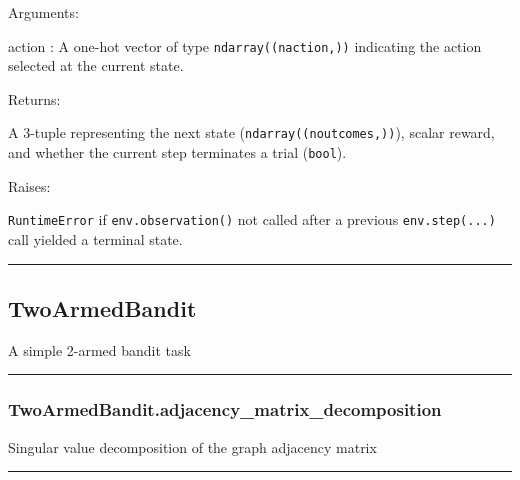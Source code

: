 Arguments:

action : A one-hot vector of type \texttt{ndarray((naction,))}
indicating the action selected at the current state.

Returns:

A 3-tuple representing the next state (\texttt{ndarray((noutcomes,))}),
scalar reward, and whether the current step terminates a trial
(\texttt{bool}).

Raises:

\texttt{RuntimeError} if \texttt{env.observation()} not called after a
previous \texttt{env.step(...)} call yielded a terminal state.

\begin{center}\rule{0.5\linewidth}{\linethickness}\end{center}

\subsection{TwoArmedBandit}\label{twoarmedbandit}

\begin{Shaded}
\begin{Highlighting}[]
\end{Highlighting}
\end{Shaded}

A simple 2-armed bandit task

\begin{center}\rule{0.5\linewidth}{\linethickness}\end{center}

\subsubsection{TwoArmedBandit.adjacency\_matrix\_decomposition}\label{twoarmedbandit.adjacency_matrix_decomposition}

\begin{Shaded}
\begin{Highlighting}[]
\NormalTok{)}
\end{Highlighting}
\end{Shaded}

Singular value decomposition of the graph adjacency matrix

\begin{center}\rule{0.5\linewidth}{\linethickness}\end{center}

